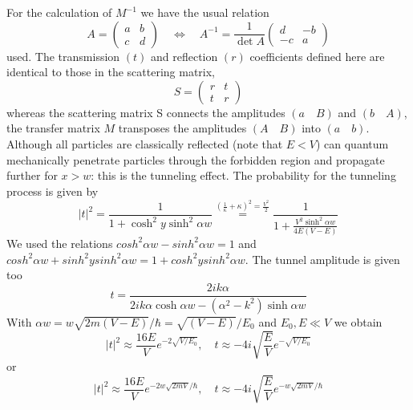 For the calculation of $M^{-1}$ we have the usual relation
\begin{equation}
A=\left(\begin{array}{ll}{a} & {b} \\ {c} & {d}\end{array}\right) \quad \Leftrightarrow \quad A^{-1}=\frac{1}{\operatorname{det} A}\left(\begin{array}{cc}{d} & {-b} \\ {-c} & {a}\end{array}\right)
\end{equation}
used. The transmission $(t)$ and reflection $(r)$ coefficients defined here are identical to those in the scattering matrix,
\begin{equation}
S=\left(\begin{array}{ll}{r} & {t} \\ {t} & {r}\end{array}\right)
\end{equation}
whereas the scattering matrix S connects the amplitudes $(a\quad B)$ and $(b\quad A)$, the transfer matrix $M$ transposes the amplitudes $(A\quad B)$ into $(a \quad b)$. Although all particles are classically reflected (note that $E <V$) can quantum mechanically penetrate particles through the forbidden region and propagate further for $x> w$: this is the tunneling effect. The probability for the tunneling process is given by
\begin{equation}
    |t|^{2}=\frac{1}{1+\cosh ^{2} y \sinh ^{2} \alpha w}\overset{{\left(\frac{1}{\kappa}+\kappa\right)^{2}}=\frac{V^{2}}{2}}{=} \frac{1}{1+\frac{V^{2} \sinh ^{2} \alpha w}{4 E(V-E)}}
    \end{equation}
We used the relations $cosh^2 \alpha w - sinh^2 \alpha w = 1$ and $cosh^2 \alpha w + sinh^2 y sinh^2 \alpha w = 1 + cosh^2 y sinh^2 \alpha w$. The tunnel amplitude is given too
\begin{equation}
    t=\frac{2 i k \alpha}{2 i k \alpha \cosh \alpha w-\left(\alpha^{2}-k^{2}\right) \sinh \alpha w}
    \end{equation}
With $\alpha w = w\sqrt{2m (V - E)} / \hbar = \sqrt{ (V - E)} / E_0$ and $E_0, E\ll V$ we obtain
\begin{equation}
    |t|^{2} \approx \frac{16 E}{V} e^{-2 \sqrt{V / E_{0}}}, \quad t \approx-4 i \sqrt{\frac{E}{V}} e^{-\sqrt{V / E_{0}}}
    \end{equation}
or
\begin{equation}
    |t|^{2} \approx \frac{16 E}{V} e^{-2 w \sqrt{2 m V} / \hbar}, \quad t \approx-4 i \sqrt{\frac{E}{V}} e^{-w \sqrt{2 m V} / \hbar}
    \end{equation}
